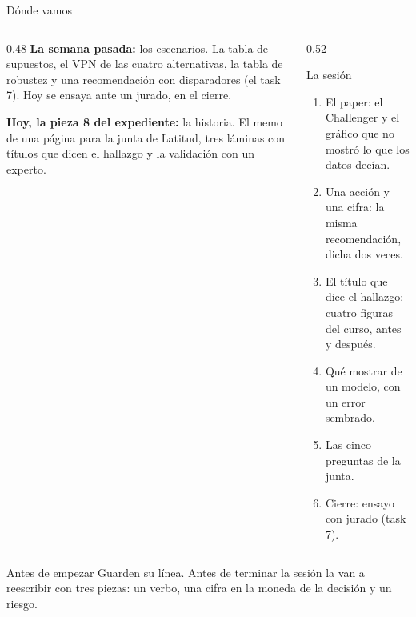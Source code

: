 \documentclass{beamer}
\begin{document}
\begin{frame}
\titlepage
\end{frame}

\begin{frame}{Dónde vamos}
\begin{columns}[T]
\begin{column}{0.48\textwidth}
\textbf{La semana pasada:} los escenarios. La tabla de supuestos, el VPN de las cuatro alternativas, la tabla de robustez y una recomendación con disparadores (el task 7). Hoy se ensaya ante un jurado, en el cierre.

\medskip
\textbf{Hoy, la pieza 8 del expediente:} la historia. El memo de una página para la junta de Latitud, tres láminas con títulos que dicen el hallazgo y la validación con un experto.
\end{column}
\begin{column}{0.52\textwidth}
\begin{block}{La sesión}
\small
\begin{enumerate}
  \item El paper: el Challenger y el gráfico que no mostró lo que los datos decían.
  \item Una acción y una cifra: la misma recomendación, dicha dos veces.
  \item El título que dice el hallazgo: cuatro figuras del curso, antes y después.
  \item Qué mostrar de un modelo, con un error sembrado.
  \item Las cinco preguntas de la junta.
  \item Cierre: ensayo con jurado (task 7).
\end{enumerate}
\end{block}
\end{column}
\end{columns}
\end{frame}

\begin{frame}{Antes de empezar}
\medskip
\small Guarden su línea. Antes de terminar la sesión la van a reescribir con tres piezas: un verbo, una cifra en la moneda de la decisión y un riesgo.
\end{frame}
\end{document}
